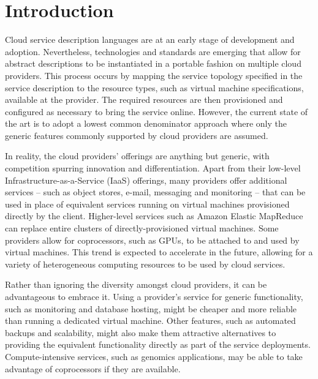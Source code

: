 \documentclass[10pt, conference, compsocconf]{IEEEtran}
\begin{document}
\maketitle


\IEEEdisplaynotcompsoctitleabstractindextext



\IEEEpeerreviewmaketitle




\section{Introduction}

Cloud service description languages are at an early stage of development and adoption. Nevertheless, technologies and standards are emerging that allow for abstract descriptions to be instantiated in a portable fashion on multiple cloud providers. This process occurs by mapping the service topology specified in the service description to the resource types, such as virtual machine specifications, available at the provider. The required resources are then provisioned and configured as necessary to bring the service online. However, the current state of the art is to adopt a lowest common denominator approach where only the generic features commonly supported by cloud providers are assumed.

In reality, the cloud providers' offerings are anything but generic, with competition spurring innovation and differentiation. Apart from their low-level Infrastructure-as-a-Service (IaaS) offerings, many providers offer additional services -- such as object stores, e-mail, messaging and monitoring -- that can be used in place of equivalent services running on virtual machines provisioned directly by the client. Higher-level services such as Amazon Elastic MapReduce can replace entire clusters of directly-provisioned virtual machines. Some providers allow for coprocessors, such as GPUs, to be attached to and used by virtual machines. This trend is expected to accelerate in the future, allowing for a variety of heterogeneous computing resources to be used by cloud services.

Rather than ignoring the diversity amongst cloud providers, it can be advantageous to embrace it. Using a provider's service for generic functionality, such as monitoring and database hosting, might be cheaper and more reliable than running a dedicated virtual machine. Other features, such as automated backups and scalability, might also make them attractive alternatives to providing the equivalent functionality directly as part of the service deployments. Compute-intensive services, such as genomics applications, may be able to take advantage of coprocessors if they are available.
\end{document}
